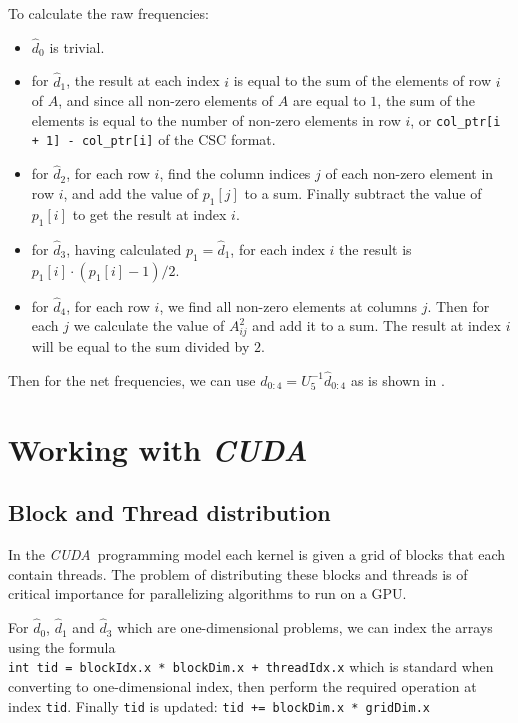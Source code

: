 \documentclass[10pt, a4paper]{article}
\newcommand{\cuda}{\textit{CUDA}}
\begin{document}
To calculate the raw frequencies:
\begin{itemize}
	\item $\hat{d}_0$ is trivial.

	\item for $\hat{d}_1$, the result at each index $i$ is equal to the sum of the elements of row $i$ of $A$,
		and since all non-zero elements of $A$ are equal to $1$, the sum of the elements is equal to the number
		of non-zero elements in row $i$, or \verb|col_ptr[i + 1] - col_ptr[i]| of the CSC format.

	\item for $\hat{d}_2$, for each row $i$, find the column indices $j$ of each non-zero element 
		in row $i$, and add the value of $p_1[j]$ to a sum. Finally subtract the value of $p_1[i]$
		to get the result at index $i$.

	\item for $\hat{d}_3$, having calculated $p_1 = \hat{d}_1$, for each index $i$ the result is 
		$p_1[i] \cdot (p_1[i] - 1)/2$.

	\item for $\hat{d}_4$, for each row $i$, we find all non-zero elements at columns $j$. Then for each $j$ we
		calculate the value of $A^2_{ij}$ and add it to a sum. The result at index $i$ will be equal to the sum
		divided by $2$.
\end{itemize}

Then for the net frequencies, we can use $d_{0:4} = U^{-1}_5 \hat{d}_{0:4}$ as is shown in \cite{floros2020}.

\section{Working with \cuda}

\subsection{Block and Thread distribution}
In the \cuda \ programming model each kernel is given a grid of blocks that each contain threads.
The problem of distributing these blocks and threads is of critical importance for parallelizing 
algorithms to run on a GPU.

For $\hat{d}_0$, $\hat{d}_1$ and $\hat{d}_3$ which are one-dimensional problems,
we can index the arrays using the formula \\
\verb|int tid = blockIdx.x * blockDim.x + threadIdx.x| which is standard when converting to one-dimensional 
index, then perform the required operation at index \verb|tid|. Finally \verb|tid| is updated:
\verb|tid += blockDim.x * gridDim.x|
\end{document}
